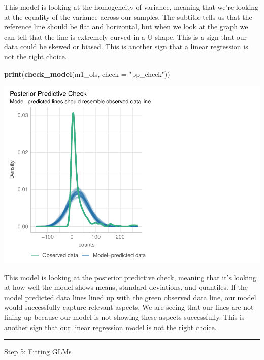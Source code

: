 \documentclass[
]{article}
\newenvironment{Shaded}{\begin{snugshade}}{\end{snugshade}}
\newcommand{\AttributeTok}[1]{\textcolor[rgb]{0.13,0.29,0.53}{#1}}
\newcommand{\FunctionTok}[1]{\textcolor[rgb]{0.13,0.29,0.53}{\textbf{#1}}}
\newcommand{\NormalTok}[1]{#1}
\newcommand{\StringTok}[1]{\textcolor[rgb]{0.31,0.60,0.02}{#1}}
\begin{document}
This model is looking at the homogeneity of variance, meaning that we're
looking at the equality of the variance across our samples. The subtitle
tells us that the reference line should be flat and horizontal, but when
we look at the graph we can tell that the line is extremely curved in a
U shape. This is a sign that our data could be skewed or biased. This is
another sign that a linear regression is not the right choice.

\begin{Shaded}
\begin{Highlighting}[]
\FunctionTok{print}\NormalTok{(}\FunctionTok{check\_model}\NormalTok{(m1\_ols, }\AttributeTok{check =} \StringTok{"pp\_check"}\NormalTok{))}
\end{Highlighting}
\end{Shaded}

\includegraphics{hw1-lobstrs-eds241_files/figure-latex/unnamed-chunk-11-1.pdf}

This model is looking at the posterior predictive check, meaning that
it's looking at how well the model shows means, standard deviations, and
quantiles. If the model predicted data lines lined up with the green
observed data line, our model would successfully capture relevant
aspects. We are seeing that our lines are not lining up because our
model is not showing these aspects successfully. This is another sign
that our linear regression model is not the right choice.

\begin{center}\rule{0.5\linewidth}{0.5pt}\end{center}

Step 5: Fitting GLMs
\end{document}
